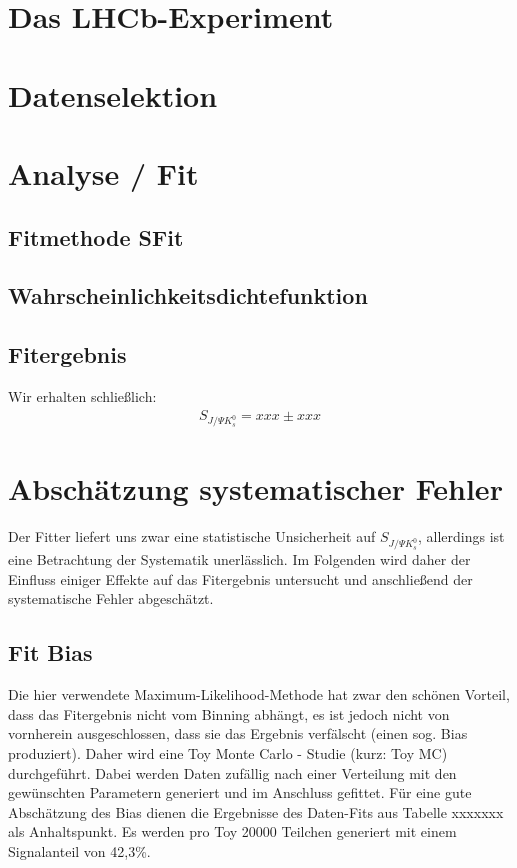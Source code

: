 \documentclass[a4paper]{scrbook}
\newcommand{\SJPsi}{S_{J/\Psi K_s^0}}
\begin{document}

\tableofcontents
\chapter{Das LHCb-Experiment}



\chapter{Datenselektion}

\chapter{Analyse / Fit}
\section{Fitmethode SFit}
\section{Wahrscheinlichkeitsdichtefunktion}
\section{Fitergebnis} \label{kap:fitergebnis}
Wir erhalten schließlich:
\begin{align}
\SJPsi = xxx \pm xxx     \label{eq:fit_result}
\end{align}

\chapter{Abschätzung systematischer Fehler}
Der Fitter liefert uns zwar eine statistische Unsicherheit auf $\SJPsi$, allerdings ist eine Betrachtung der Systematik unerlässlich. Im Folgenden wird daher der Einfluss einiger Effekte auf das Fitergebnis untersucht und anschließend der systematische Fehler abgeschätzt.

\section{Fit Bias}
Die hier verwendete Maximum-Likelihood-Methode hat zwar den schönen Vorteil, dass das Fitergebnis nicht vom Binning abhängt, es ist jedoch nicht von vornherein ausgeschlossen, dass sie das Ergebnis verfälscht (einen sog. Bias produziert). Daher wird eine Toy Monte Carlo - Studie (kurz: Toy MC) durchgeführt. Dabei werden Daten zufällig nach einer Verteilung mit den gewünschten Parametern generiert und im Anschluss gefittet. Für eine gute Abschätzung des Bias dienen die Ergebnisse des Daten-Fits aus Tabelle xxxxxxx als Anhaltspunkt. Es werden pro Toy 20000 Teilchen generiert mit einem Signalanteil von 42,3\%.
\end{document}
